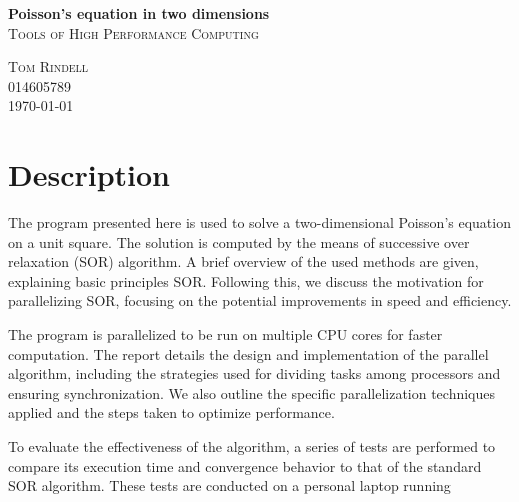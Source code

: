 \documentclass[12pt, letterpaper]{article}
\author{Tom Rindell}
\title{}
\begin{document}
\begin{titlepage}
  \begin{center}
    \vspace*{5cm}
  \Huge{\bfseries Poisson's equation in two dimensions}\\
  \textsc{\LARGE Tools of High Performance Computing}\\
  \vfill
  \end{center}
  \begin{flushright}
  \textsc{\large Tom Rindell}\\
  \textsc{\large 014605789}\\
  \textsc{\large \today}\\
  \end{flushright}
\end{titlepage}

\section{Description}
The program presented here is used to solve a two-dimensional Poisson's equation on a unit square.
The solution is computed by the means of successive over relaxation (SOR) algorithm.
A brief overview of the used methods are given, explaining basic principles SOR. 
Following this, we discuss the motivation for parallelizing SOR, focusing on the potential improvements in speed and efficiency.

The program is parallelized to be run on multiple CPU cores for faster computation.
The report details the design and implementation of the parallel algorithm, including the strategies used for dividing tasks among processors and ensuring synchronization. 
We also outline the specific parallelization techniques applied and the steps taken to optimize performance.

To evaluate the effectiveness of the algorithm, a series of tests are performed to compare its execution time and convergence behavior to that of the standard SOR algorithm. 
These tests are conducted on a personal laptop running 
\end{document}
